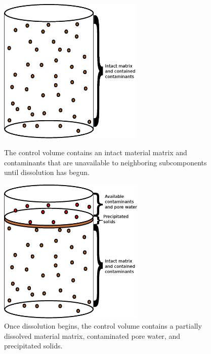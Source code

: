 \begin{figure}[h!]
\begin{minipage}[b]{0.5\linewidth}
  \begin{center}
    \includegraphics[height=7cm]{./chapters/nuclide_models/mixed_cell/mixed_cell_whole.eps}
  \end{center}
  \caption[Intact Mixed Cell Control Volume]{The control volume contains an 
  intact material matrix and contaminants that are unavailable to neighboring 
  subcomponents until dissolution has begun.}
  \label{fig:intact}
\end{minipage}
\hspace{0.5cm}
\begin{minipage}[b]{0.5\linewidth}
  \begin{center}
    \includegraphics[height=7cm]{./chapters/nuclide_models/mixed_cell/mixed_cell_degraded.eps}
  \end{center}
  \caption[Degrading Mixed Cell Control Volume]{Once dissolution begins, the 
  control volume contains a partially dissolved material matrix, contaminated 
  pore water, and precipitated solids.}
  \label{fig:dissolved}
\end{minipage}
\end{figure}

